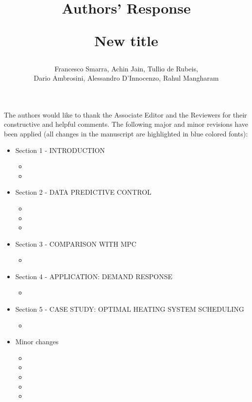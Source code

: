 \documentclass{article}
\begin{document}
\title{Authors' Response \\
\begin{Large}
	New title
\end{Large}
}
\author{Francesco Smarra, Achin Jain, Tullio de Rubeis, \\ Dario Ambrosini, Alessandro D’Innocenzo, Rahul Mangharam}

\date{}
\maketitle

\bigskip

The authors would like to thank the Associate Editor and the Reviewers for their constructive and helpful comments. The following major and minor revisions have been applied (all changes in the manuscript are highlighted in \textcolor[rgb]{0.00,0.00,1.00}{blue colored fonts}):
\begin{itemize}
	\item Section 1 - INTRODUCTION
	\begin{itemize}
		\item 
		\item 
	\end{itemize}
	\item Section 2 - DATA PREDICTIVE CONTROL
	\begin{itemize}
		\item 
		\item 
		\item 
	\end{itemize}
	\item Section 3 - COMPARISON WITH MPC
	\begin{itemize}
		\item 
	\end{itemize}
	\item Section 4 - APPLICATION: DEMAND RESPONSE
	\begin{itemize}
		\item 
	\end{itemize}
	\item Section 5 - CASE STUDY: OPTIMAL HEATING SYSTEM SCHEDULING
	\begin{itemize}
		\item 
	\end{itemize}
	\item Minor changes
	\begin{itemize}
		\item 
		\item 
		\item 
		\item 
		\item 
	\end{itemize}
\end{itemize}
\end{document}
